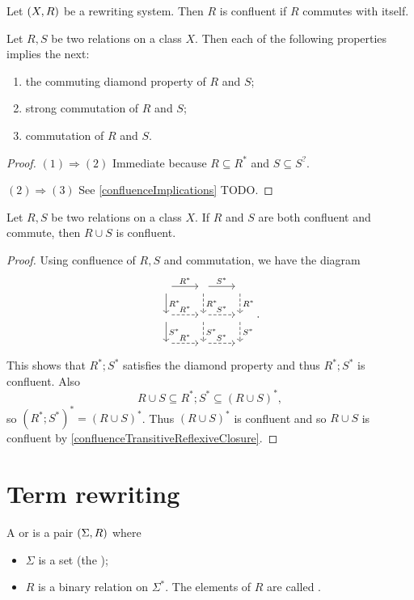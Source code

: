 \begin{lemma}
Let $\sSet{X,R}$ be a rewriting system. Then $R$ is confluent if $R$ commutes with itself.
\end{lemma}

\begin{lemma}
Let $R,S$ be two relations on a class $X$. Then each of the following properties implies
the next:
\begin{enumerate}
\item the commuting diamond property of $R$ and $S$;
\item strong commutation of $R$ and $S$;
\item commutation of $R$ and $S$.
\end{enumerate}
\end{lemma}
\begin{proof}
$(1) \Rightarrow (2)$ Immediate because $R\subseteq R^*$ and $S\subseteq S^?$.

$(2) \Rightarrow (3)$ See \ref{confluenceImplications} TODO.
\end{proof}

\begin{proposition}
Let $R,S$ be two relations on a class $X$. If $R$ and $S$ are both confluent and commute, then $R\cup S$ is confluent.
\end{proposition}
\begin{proof}
Using confluence of $R, S$ and commutation, we have the diagram
\[ \begin{tikzcd}[]
{\hspace{1pt}} \arrow[r, "{R^*}"] \arrow[d, "{R^*}"] & {} \arrow[r, "{S^*}"] \arrow[d,  dashed, "{R^*}"] & {} \arrow[d, dashed, "{R^*}"] \\
{\hspace{1pt}} \arrow[r, dashed, "{R^*}"] \arrow[d, "{S^*}"] & {} \arrow[r, dashed, "{S^*}"] \arrow[d, dashed, "{S^*}"] & {} \arrow[d, dashed, "{S^*}"] \\
{\hspace{1pt}} \arrow[r, dashed, "{R^*}"]  & {} \arrow[r, dashed, "{S^*}"] & {} 
\end{tikzcd}. \]
This shows that $R^*;S^*$ satisfies the diamond property and thus $R^*;S^*$ is confluent. Also
\[ R\cup S \subseteq R^*;S^* \subseteq (R\cup S)^*, \]
so $(R^*;S^*)^* = (R\cup S)^*$. Thus $(R\cup S)^*$ is confluent and so $R\cup S$ is confluent by \ref{confluenceTransitiveReflexiveClosure}. 
\end{proof}

\section{Term rewriting}
\begin{definition}
A  or  is a pair $\sSet{\Sigma, R}$ where
\begin{itemize}
\item $\Sigma$ is a set (the );
\item $R$ is a binary relation on $\Sigma^*$. The elements of $R$ are called .
\end{itemize}
\end{definition}

